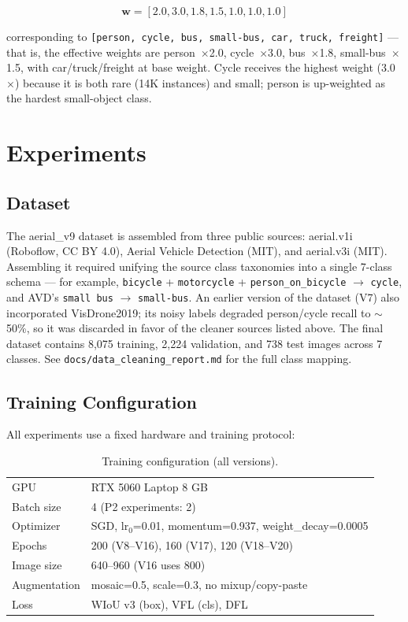 \documentclass[11pt]{article}
\begin{document}
\begin{equation}
    \mathbf{w} = [2.0, 3.0, 1.8, 1.5, 1.0, 1.0, 1.0]
\end{equation}

corresponding to \texttt{[person, cycle, bus, small-bus, car, truck, freight]} — that is,
the effective weights are person~$\times$2.0, cycle~$\times$3.0, bus~$\times$1.8,
small-bus~$\times$1.5, with car/truck/freight at base weight. Cycle receives the highest weight
(3.0$\times$) because it is both rare (14K instances) and small; person is up-weighted as the
hardest small-object class.

\section{Experiments}
\label{sec:experiments}

\subsection{Dataset}

The aerial\_v9 dataset is assembled from three public sources: aerial.v1i (Roboflow, CC BY 4.0),
Aerial Vehicle Detection (MIT), and aerial.v3i (MIT). Assembling it required unifying the source
class taxonomies into a single 7-class schema — for example, \texttt{bicycle} + \texttt{motorcycle}
+ \texttt{person\_on\_bicycle} $\rightarrow$ \texttt{cycle}, and AVD's \texttt{small bus}
$\rightarrow$ \texttt{small-bus}. An earlier version of the dataset (V7) also incorporated
VisDrone2019; its noisy labels degraded person/cycle recall to $\sim$50\%, so it was discarded in
favor of the cleaner sources listed above. The final dataset contains 8,075 training, 2,224
validation, and 738 test images across 7 classes. See \texttt{docs/data\_cleaning\_report.md} for
the full class mapping.

\subsection{Training Configuration}

All experiments use a fixed hardware and training protocol:

\begin{table}[H]
\centering
\caption{Training configuration (all versions).}
\begin{tabular}{ll}
\toprule
GPU & RTX 5060 Laptop 8 GB \\
Batch size & 4 (P2 experiments: 2) \\
Optimizer & SGD, lr$_{0}$=0.01, momentum=0.937, weight\_decay=0.0005 \\
Epochs & 200 (V8--V16), 160 (V17), 120 (V18--V20) \\
Image size & 640--960 (V16 uses 800) \\
Augmentation & mosaic=0.5, scale=0.3, no mixup/copy-paste \\
Loss & WIoU v3 (box), VFL (cls), DFL \\
\bottomrule
\end{tabular}
\end{table}
\end{document}
